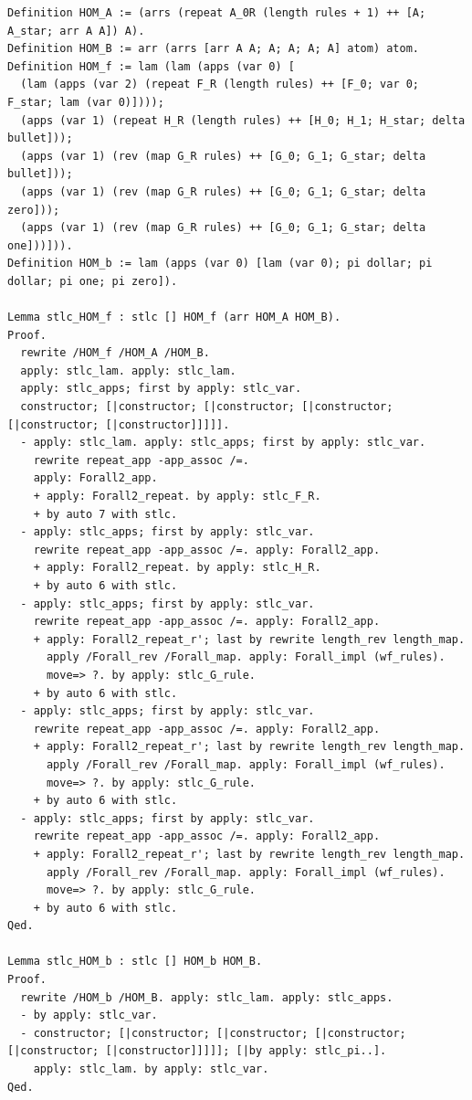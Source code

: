 \begin{lstlisting}
Definition HOM_A := (arrs (repeat A_0R (length rules + 1) ++ [A; A_star; arr A A]) A).
Definition HOM_B := arr (arrs [arr A A; A; A; A; A] atom) atom.
Definition HOM_f := lam (lam (apps (var 0) [
  (lam (apps (var 2) (repeat F_R (length rules) ++ [F_0; var 0; F_star; lam (var 0)])));
  (apps (var 1) (repeat H_R (length rules) ++ [H_0; H_1; H_star; delta bullet]));
  (apps (var 1) (rev (map G_R rules) ++ [G_0; G_1; G_star; delta bullet]));
  (apps (var 1) (rev (map G_R rules) ++ [G_0; G_1; G_star; delta zero]));
  (apps (var 1) (rev (map G_R rules) ++ [G_0; G_1; G_star; delta one]))])).
Definition HOM_b := lam (apps (var 0) [lam (var 0); pi dollar; pi dollar; pi one; pi zero]).

Lemma stlc_HOM_f : stlc [] HOM_f (arr HOM_A HOM_B).
Proof.
  rewrite /HOM_f /HOM_A /HOM_B.
  apply: stlc_lam. apply: stlc_lam.
  apply: stlc_apps; first by apply: stlc_var.
  constructor; [|constructor; [|constructor; [|constructor; [|constructor; [|constructor]]]]].
  - apply: stlc_lam. apply: stlc_apps; first by apply: stlc_var.
    rewrite repeat_app -app_assoc /=.
    apply: Forall2_app.
    + apply: Forall2_repeat. by apply: stlc_F_R.
    + by auto 7 with stlc.
  - apply: stlc_apps; first by apply: stlc_var.
    rewrite repeat_app -app_assoc /=. apply: Forall2_app.
    + apply: Forall2_repeat. by apply: stlc_H_R.
    + by auto 6 with stlc.
  - apply: stlc_apps; first by apply: stlc_var.
    rewrite repeat_app -app_assoc /=. apply: Forall2_app.
    + apply: Forall2_repeat_r'; last by rewrite length_rev length_map.
      apply /Forall_rev /Forall_map. apply: Forall_impl (wf_rules).
      move=> ?. by apply: stlc_G_rule.
    + by auto 6 with stlc.
  - apply: stlc_apps; first by apply: stlc_var.
    rewrite repeat_app -app_assoc /=. apply: Forall2_app.
    + apply: Forall2_repeat_r'; last by rewrite length_rev length_map.
      apply /Forall_rev /Forall_map. apply: Forall_impl (wf_rules).
      move=> ?. by apply: stlc_G_rule.
    + by auto 6 with stlc.
  - apply: stlc_apps; first by apply: stlc_var.
    rewrite repeat_app -app_assoc /=. apply: Forall2_app.
    + apply: Forall2_repeat_r'; last by rewrite length_rev length_map.
      apply /Forall_rev /Forall_map. apply: Forall_impl (wf_rules).
      move=> ?. by apply: stlc_G_rule.
    + by auto 6 with stlc.
Qed.

Lemma stlc_HOM_b : stlc [] HOM_b HOM_B.
Proof.
  rewrite /HOM_b /HOM_B. apply: stlc_lam. apply: stlc_apps.
  - by apply: stlc_var.
  - constructor; [|constructor; [|constructor; [|constructor; [|constructor; [|constructor]]]]]; [|by apply: stlc_pi..].
    apply: stlc_lam. by apply: stlc_var.
Qed.


\end{lstlisting}
